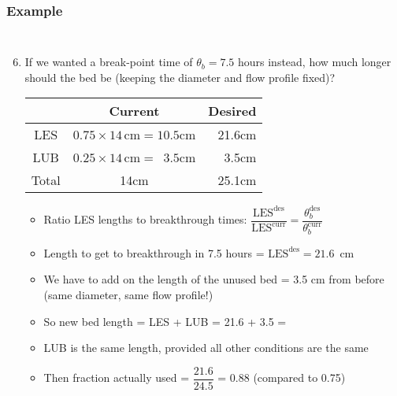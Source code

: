\begin{frame}\frametitle{Example}
	\vspace{-12pt}
	\begin{columns}[t]
		\begin{enumerate}
			\setcounter{enumi}{5}

			\item	If we wanted a break-point time of $\theta_b = 7.5$ hours instead, how much longer should the bed be {\small (keeping the diameter and flow profile fixed)}?
			
			\begin{center}
				\begin{tabular}{c||c|r}
							&	\textbf{Current}			& \textbf{Desired} \\ \hline
					LES		&	$0.75 \times 14\,\text{cm} = 10.5$cm	&	21.6cm \\
					LUB 	&	$0.25 \times 14\,\text{cm} = \,\,\,3.5$cm	&	3.5cm\\ \hline
					Total 	&	14cm						&   25.1cm\\
				\end{tabular}
			\end{center}
			
			\begin{itemize}
				\item	Ratio LES lengths to breakthrough times: $ \dfrac{\text{LES}^\text{des}}{\text{LES}^\text{curr}} =  \dfrac{\theta_b^\text{des}}{\theta_b^\text{curr}}$
				\item	Length to get to breakthrough in 7.5 hours = $\text{LES}^\text{des} = 21.6$~cm
				\item	We have to add on the length of the unused bed = {\color{red}3.5} cm from before (same diameter, same flow profile!)
				\item	So new bed length = LES + LUB = 21.6 + {\color{red}3.5}  = {\color{myOrange}{25.1 cm}}
				\item	LUB is the same length, provided all other conditions are the same
				\item	Then fraction actually used = $\dfrac{21.6}{24.5}$ = 0.88 {\scriptsize (compared to 0.75)}
			\end{itemize}
		\end{enumerate}
	\end{columns}
\end{frame}


